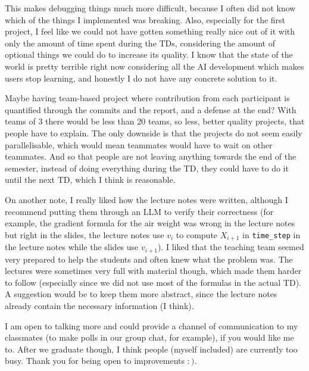 \documentclass[12pt,a4paper]{article}
\begin{document}
This makes debugging things much more difficult, because I often did not know which of the things I implemented was breaking. Also, especially for the first project, I feel like we could not have gotten something really nice out of it with only the amount of time spent during the TDs, considering the amount of optional things we could do to increase its quality. I know that the state of the world is pretty terrible right now considering all the AI development which makes users stop learning, and honestly I do not have any concrete solution to it.

Maybe having team-based project where contribution from each participant is quantified through the commits and the report, and a defense at the end? With teams of 3 there would be less than 20 teams, so less, better quality projects, that people have to explain. The only downside is that the projects do not seem easily parallelisable, which would mean teammates would have to wait on other teammates. And so that people are not leaving anything towards the end of the semester, instead of doing everything during the TD, they could have to do it until the next TD, which I think is reasonable.

On another note, I really liked how the lecture notes were written, although I recommend putting them through an LLM to verify their correctness (for example, the gradient formula for the air weight was wrong in the lecture notes but right in the slides, the lecture notes use $v_i$ to compute $X_{i + 1}$ in \texttt{time\_step} in the lecture notes while the slides use $v_{i + 1}$). I liked that the teaching team seemed very prepared to help the students and often knew what the problem was. The lectures were sometimes very full with material though, which made them harder to follow (especially since we did not use most of the formulas in the actual TD). A suggestion would be to keep them more abstract, since the lecture notes already contain the necessary information (I think).

I am open to talking more and could provide a channel of communication to my classmates (to make polls in our group chat, for example), if you would like me to. After we graduate though, I think people (myself included) are currently too busy. Thank you for being open to improvements $:)$.
\end{document}
